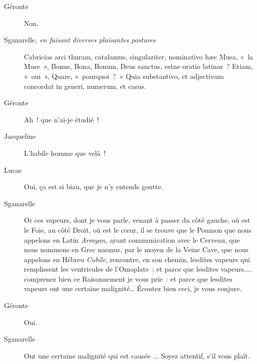 \documentclass[french,twoside]{book} %
\begin{document}
 \begin{description} \item[Géronte] 

Non.\end{description}
 \begin{description} \item[Sganarelle\textit{, en faisant diverses plaisantes postures}\par
] 

Cabricias arci thuram, catalamus, singulariter, nominativo hæc Musa, « la Muse », Bonus, Bona, Bonum, Deus sanctus, estne oratio latinas ? Etiam, « oui », Quare, « pourquoi ? » Quia substantivo, et adjectivum concordat in generi, numerum, et casus.\end{description}
 \begin{description} \item[Géronte] 

Ah ! que n’ai-je étudié !\end{description}
 \begin{description} \item[Jacqueline] 

L’habile homme que velà !\end{description}
 \begin{description} \item[Lucas] 

Oui, ça est si biau, que je n’y entends goutte.\end{description}
 \begin{description} \item[Sganarelle] 

Or ces vapeurs, dont je vous parle, venant à passer du côté gauche, où est le Foie, au côté Droit, où est le cœur, il se trouve que le Poumon que nous appelons en Latin {\itshape Armyan}, ayant communication avec le Cerveau, que nous nommons en Grec nasmus, par le moyen de la Veine Cave, que nous appelons en Hébreu {\itshape Cubile}, rencontre, en son chemin, lesdites vapeurs qui remplissent les ventricules de l’Omoplate ; et parce que lesdites vapeurs.... comprenez bien ce Raisonnement je vous prie : et parce que lesdites vapeurs ont une certaine malignité… Écoutez bien ceci, je vous conjure.\end{description}
 \begin{description} \item[Géronte] 

Oui.\end{description}
 \begin{description} \item[Sganarelle] 

Ont une certaine malignité qui est causée ... Soyez attentif, s’il vous plaît.\end{description}
\end{document}
